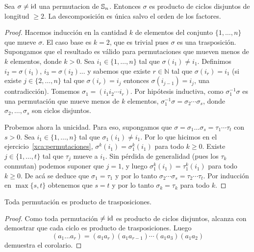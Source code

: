 \begin{prop}
	Sea $\sigma\ne\operatorname{id}$ una permutacion de $\mathbb{S}_n$.  Entonces $\sigma$ es
	producto de ciclos disjuntos de longitud $\geq2$.  La descomposición es
	única salvo el orden de los factores.

    \begin{proof}
		Hacemos inducción en la cantidad $k$ de elementos del conjunto
		$\{1,\dots,n\}$ que mueve $\sigma$. El caso base es $k=2$, que es
		trivial pues $\sigma$ es una trasposición. Supongamos que el resultado
		es válido para permutaciones que mueven menos de $k$ elementos, donde
		$k>0$. Sea $i_{1}\in\{1,\dots,n\}$ tal que $\sigma(i_{1})\ne i_{1}$.
		Definimos $i_{2}=\sigma(i_{1})$, $i_{3}=\sigma(i_{2})$... y sabemos que
		existe $r\in\mathbb{N}$ tal que $\sigma(i_{r})=i_{1}$ (si existe
		$j\in\{2,\dots,n\}$ tal que $\sigma(i_{r})=i_{j}$ entonces
		$\sigma(i_{j-1})=i_{j}$, una contradicción).  Tomemos
		$\sigma_{1}=(i_{1}i_{2}\cdots i_{r})$. Por hipótesis inductiva, como
		$\sigma_{1}^{-1}\sigma$ es una permutación que mueve menos de $k$
		elementos, $\sigma_{1}^{-1}\sigma=\sigma_{2}\cdots\sigma_{s}$, donde
		$\sigma_{2},\dots,\sigma_{s}$ son ciclos disjuntos. 

		Probemos ahora la unicidad. Para eso, supongamos que
		$\sigma=\sigma_{1}\dots\sigma_{s}=\tau_{1}\cdots\tau_{t}$ con $s>0$.
		Sea $i_{1}\in\{1,\dots,n\}$ tal que $\sigma_{1}(i_{1})\ne i_{1}$.  Por
		lo que hicimos en el ejercicio~\ref{xca:permutaciones},
		$\sigma^{k}(i_{1})=\sigma_{1}^{k}(i_{1})$ para todo $k\geq0$. Existe
		$j\in\{1,\dots,t\}$ tal que $\tau_{j}$ mueve a $i_{1}$. Sin pérdida de
		generalidad (pues los $\tau_{k}$ conmutan) podemos suponer que $j=1$, y
		luego $\sigma_{1}^{k}(i_{1})=\tau_{1}^{k}(i_{1})$ para todo $k\geq0.$
		De acá se deduce que $\sigma_{1}=\tau_{1}$ y por lo tanto
		$\sigma_{2}\cdots\sigma_{s}=\tau_{2}\cdots\tau_{t}$.  Por inducción en
		$\max\{s,t\}$ obtenemos que $s=t$ y por lo tanto $\sigma_{k}=\tau_{k}$
		para todo $k$. 
    \end{proof}
\end{prop}

\begin{cor}
    \label{cor:trasposiciones}
    Toda permutación es producto de trasposiciones. 

    \begin{proof}
        Como toda permutación $\ne\operatorname{id}$ es producto de ciclos disjuntos, alcanza
        con demostrar que cada ciclo es producto de trasposiciones. Luego
        \[
            (a_{1}\dots a_{r})=(a_{1}a_{r})(a_{1}a_{r-1})\cdots(a_{1}a_{3})(a_{1}a_{2})
        \]
        demuestra el corolario.
    \end{proof}
\end{cor}


